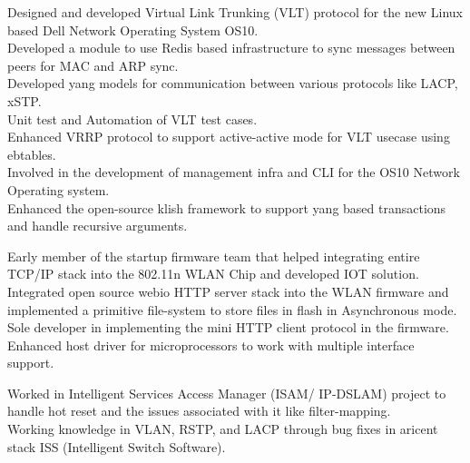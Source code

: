 \documentclass[]{mariappan-resume}
\begin{document}
\begin{minipage}[t]{0.66\textwidth}
 
\noindent
\hspace{5em}%
\begin{minipage}{0.85\textwidth\vspace{2pt}}
Designed and developed Virtual Link Trunking (VLT) protocol for the new Linux based Dell Network Operating System OS10.\\
Developed a module to use Redis based infrastructure to sync messages between peers for MAC and ARP sync.\\
Developed yang models for communication between various protocols like LACP, xSTP. \\
Unit test and Automation of VLT test cases.\\
Enhanced VRRP protocol to support active-active mode for VLT usecase using ebtables.\\
Involved in the development of management infra and CLI for the OS10 Network Operating system.\\
Enhanced the open-source klish framework to support yang based transactions and handle recursive arguments.

\end{minipage}
\sectionsep

 
\noindent
\hspace{5em}%
\begin{minipage}{0.85\textwidth\vspace{2pt}}
Early member of the startup firmware team that helped integrating entire TCP/IP stack into the 802.11n WLAN Chip and developed IOT solution.\\
Integrated open source webio HTTP server stack into the WLAN firmware and implemented a primitive file-system to store files in flash in Asynchronous mode.\\
Sole developer in implementing the mini HTTP client protocol in the firmware.\\
Enhanced host driver for microprocessors to work with multiple interface support.
\end{minipage}
\sectionsep

 
\noindent
\hspace{5em}%
\begin{minipage}{0.85\textwidth\vspace{2pt}}
Worked in Intelligent Services Access Manager (ISAM/ IP-DSLAM) project to handle hot reset and the issues associated with it like filter-mapping.\\
Working knowledge in VLAN, RSTP, and LACP through bug fixes in aricent stack ISS (Intelligent Switch Software).

\end{minipage}

\end{minipage} 
\end{document}
